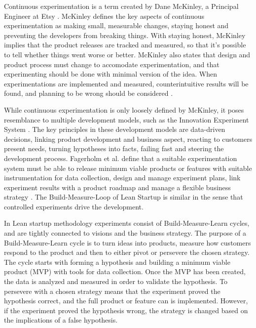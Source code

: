 \documentclass[english]{tktltiki2}
\theoremstyle{definition}
\theoremstyle{remark}
\begin{document}
Continuous experimentation is a term created by Dane McKinley, a Principal Engineer at Etsy \cite{mcfunley}. McKinley defines the key aspects of continuous experimentation as making small, measurable changes, staying honest and preventing the developers from breaking things. With staying honest, McKinley implies that the product releases are tracked and measured, so that it's possible to tell whether things went worse or better. McKinley also states that design and product process must change to accomodate experimentation, and that experimenting should be done with minimal version of the idea. When experimentations are implemented and measured, counterintuitive results will be found, and planning to be wrong should be considered \cite{mcfunley}. 

While continuous experimentation is only loosely defined by McKinley, it poses resemblance to multiple development models, such as the Innovation Experiment System \cite{bosch2012building}. The key principles in these development models are data-driven decisions, linking product development and business aspect, reacting to customers present needs, turning hypotheses into facts, failing fast and steering the development process. Fagerholm et al. define that a suitable experimentation system must be able to release minimum viable products or features with suitable instrumentation for data collection, design and manage experiment plans, link experiment results with a product roadmap and manage a flexible business strategy \cite{fagerholm2014building}. The Build-Measure-Loop of Lean Startup is similar in the sense that controlled experiments drive the development.

In Lean startup methodology \cite{ries2011lean} experiments consist of Build-Measure-Learn cycles, and are tightly connected to visions and the business strategy. The purpose of a Build-Measure-Learn cycle is to turn ideas into products, measure how customers respond to the product and then to either pivot or persevere the chosen strategy. The cycle starts with forming a hypothesis and building a minimum viable product (MVP) with tools for data collection. Once the MVP has been created, the data is analyzed and measured in order to validate the hypothesis. To persevere with a chosen strategy means that the experiment proved the hypothesis correct, and the full product or feature can is implemented. However, if the experiment proved the hypothesis wrong, the strategy is changed based on the implications of a false hypothesis.
\end{document}
